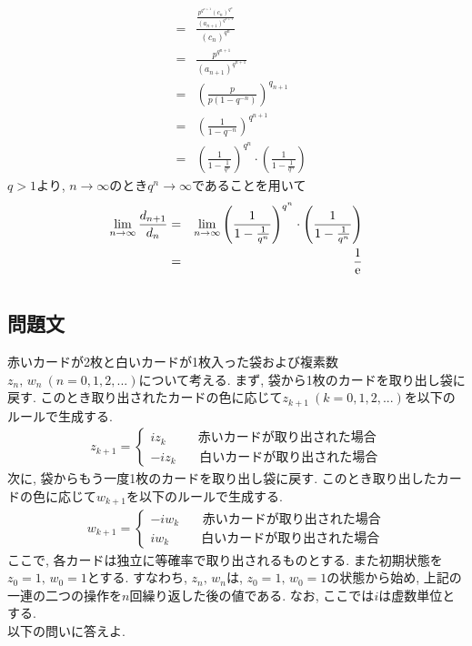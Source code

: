 \documentclass[dvipdfmx,titlepage, 11pt, a4paper]{jsarticle}%
\begin{document}
\begin{enumerate}[(1)]
\begin{eqnarray*}
		      &=&\frac{\displaystyle \frac{p^{q^{n+1}}(c_{n})^{q^{n}}}{(a_{n+1})^{q^{n+1}}}}{(c_{n})^{q^{n}}}\\
		      &=&\frac{p^{q^{n+1}}}{(a_{n+1})^{q^{n+1}}}\\
		      &=&\left(\frac{p}{p(1-q^{-n})}\right)^{q_{n+1}}\\
		      &=&\left(\frac{1}{1-q^{-n}}\right)^{q^{n+1}}\\
		      &=&\left(\frac{1}{1-\frac{1}{q^{n}}}\right)^{q^{n}}\cdot \left(\frac{1}{1-\frac{1}{q^{n}}}\right)
	      \end{eqnarray*}
	      $q>1$より, $n\to \infty$のとき$q^{n}\to \infty$であることを用いて
	      \begin{eqnarray*}
		      \lim_{n\to \infty}\frac{d_{n+1}}{d_{n}}&=&\lim_{n\to \infty}\left(\frac{1}{1-\frac{1}{q^{n}}}\right)^{q^{n}}\cdot \left(\frac{1}{1-\frac{1}{q^{n}}}\right)\\
		      &=& \frac{1}{\rm e}
	      \end{eqnarray*}
\end{enumerate}
\newpage
\section{}%
\subsection{問題文}
赤いカードが2枚と白いカードが1枚入った袋および複素数$z_{n},\,w_{n}\ (n=0,1,2,...)$について考える. まず, 袋から1枚のカードを取り出し袋に戻す. このとき取り出されたカードの色に応じて$z_{k+1}\ (k=0,1,2,...)$を以下のルールで生成する.
\begin{eqnarray*}
	z_{k+1}=\left\{\begin{array}{l}iz_{k}\hspace{30pt} 赤いカードが取り出された場合\\-iz_{k}\hspace{22pt} 白いカードが取り出された場合\end{array}\right.
\end{eqnarray*}
次に, 袋からもう一度1枚のカードを取り出し袋に戻す. このとき取り出したカードの色に応じて$w_{k+1}$を以下のルールで生成する.
\begin{eqnarray*}
	w_{k+1}=\left\{\begin{array}{l}-iw_{k}\hspace{22pt} 赤いカードが取り出された場合\\iw_{k}\hspace{30pt} 白いカードが取り出された場合\end{array}\right.
\end{eqnarray*}
ここで, 各カードは独立に等確率で取り出されるものとする. また初期状態を$z_{0}=1,\,w_{0}=1$とする. すなわち, $z_{n},\,w_{n}$は, $z_{0}=1,\,w_{0}=1$の状態から始め, 上記の一連の二つの操作を$n$回繰り返した後の値である. なお, ここでは$i$は虚数単位とする.\\[0.5cm]
\hspace{10pt} 以下の問いに答えよ.
\end{document}
